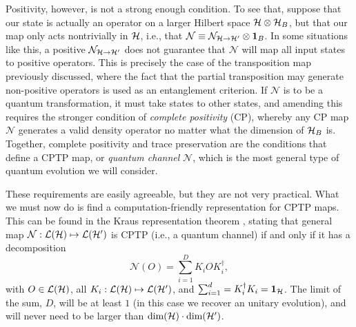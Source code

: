 		Positivity, however, is not a strong enough condition. To see that, suppose that our state is actually an operator on a larger Hilbert space $\mathcal{H} \otimes \mathcal{H}_B$, but that our map only acts nontrivially in $\mathcal{H}$, i.e., that $\mathcal{N} \equiv \mathcal{N}_{\mathcal{H} \rightarrow \mathcal{H}^\prime} \otimes \mathbf{1}_B$. In some situations like this, a positive $\mathcal{N}_{\mathcal{H} \rightarrow \mathcal{H}^\prime}$ does not guarantee that $\mathcal{N}$ will map all input states to positive operators.  This is precisely the case of the transposition map previously discussed, where the fact that the partial transposition may generate non-positive operators is used as an entanglement criterion. If $\mathcal{N}$ is to be a quantum transformation, it must take states to other states, and amending this requires the stronger condition of \emph{complete positivity} (CP), whereby any CP map $\mathcal{N}$ generates a valid density operator no matter what the dimension of $\mathcal{H}_B$ is. Together, complete positivity and trace preservation are the conditions that define a CPTP map, or \emph{quantum channel} $\mathcal{N}$, which is the most general type of quantum evolution we will consider.
		
		These requirements are easily agreeable, but they are not very practical. What we must now do is find a computation-friendly representation for CPTP maps. This can be found in the Kraus representation theorem \cite{wilde_2013_book}, stating that general map $\mathcal{N} : \mathcal{L}(\mathcal{H}) \mapsto \mathcal{L}(\mathcal{H}^\prime)$ is CPTP (i.e., a quantum channel) if and only if it has a decomposition
		$$
			\mathcal{N}(O) = \sum_{i=1}^D K_i O K_i^\dagger ,
		$$
		with $O \in \mathcal{L}(\mathcal{H})$, all $K_i : \mathcal{L}(\mathcal{H}) \mapsto \mathcal{L}(\mathcal{H}^\prime)$, and $\sum_{i=1}^d = K_i^\dagger K_i = \mathbf{1}_{\mathcal{H}}$. The limit of the sum, $D$, will be at least $1$ (in this case we recover an unitary evolution), and will never need to be larger than $\text{dim}(\mathcal{H}) \cdot \text{dim}(\mathcal{H}^\prime)$.
		
